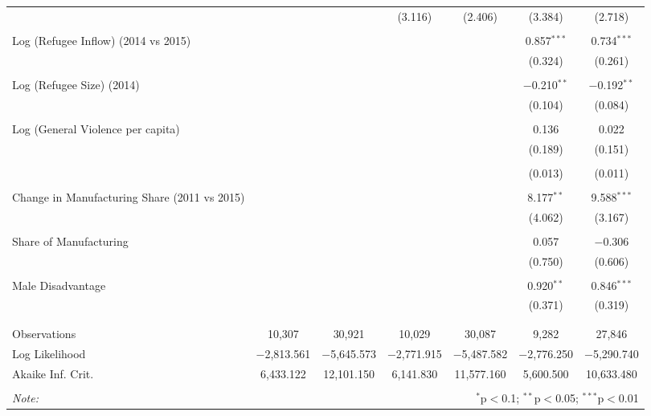 \begin{table}[!htbp]
\begin{tabular}{@{\extracolsep{5pt}}lcccccc}
  &  &  & (3.116) & (2.406) & (3.384) & (2.718) \\ 
  & & & & & & \\ 
 Log (Refugee Inflow) (2014 vs 2015) &  &  &  &  & 0.857$^{***}$ & 0.734$^{***}$ \\ 
  &  &  &  &  & (0.324) & (0.261) \\ 
  & & & & & & \\ 
 Log (Refugee Size) (2014) &  &  &  &  & $-$0.210$^{**}$ & $-$0.192$^{**}$ \\ 
  &  &  &  &  & (0.104) & (0.084) \\ 
  & & & & & & \\ 
 Log (General Violence per capita) &  &  &  &  & 0.136 & 0.022 \\ 
  &  &  &  &  & (0.189) & (0.151) \\ 
  & & & & & & \\ 
  &  &  &  &  & (0.013) & (0.011) \\ 
  & & & & & & \\ 
 Change in Manufacturing Share (2011 vs 2015) &  &  &  &  & 8.177$^{**}$ & 9.588$^{***}$ \\ 
  &  &  &  &  & (4.062) & (3.167) \\ 
  & & & & & & \\ 
 Share of Manufacturing &  &  &  &  & 0.057 & $-$0.306 \\ 
  &  &  &  &  & (0.750) & (0.606) \\ 
  & & & & & & \\ 
 Male Disadvantage &  &  &  &  & 0.920$^{**}$ & 0.846$^{***}$ \\ 
  &  &  &  &  & (0.371) & (0.319) \\ 
  & & & & & & \\ 
\hline \\[-1.8ex] 
Observations & 10,307 & 30,921 & 10,029 & 30,087 & 9,282 & 27,846 \\ 
Log Likelihood & $-$2,813.561 & $-$5,645.573 & $-$2,771.915 & $-$5,487.582 & $-$2,776.250 & $-$5,290.740 \\ 
Akaike Inf. Crit. & 6,433.122 & 12,101.150 & 6,141.830 & 11,577.160 & 5,600.500 & 10,633.480 \\ 
\hline 
\hline \\[-1.8ex] 
\textit{Note:}  & \multicolumn{6}{r}{$^{*}$p$<$0.1; $^{**}$p$<$0.05; $^{***}$p$<$0.01} \\ 
\end{tabular} 
\end{table} 
